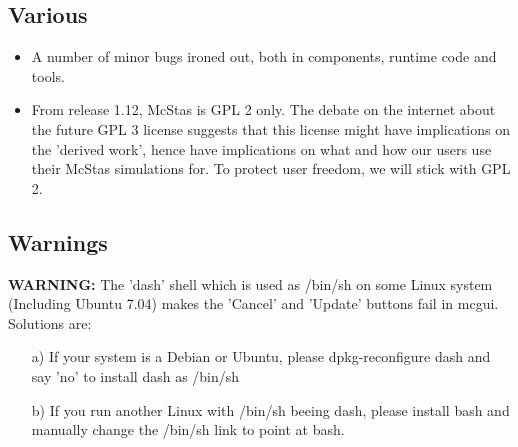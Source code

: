 \subsection{Various}
\begin{itemize}
\item  A number of minor bugs ironed out, both in components, runtime code and tools.
\item From release 1.12, McStas is GPL 2 only. The debate on the internet about the future GPL 3 license suggests that this license 
     might have implications on the 'derived work', hence have implications on what and how our users use their McStas simulations
     for. To protect user freedom, we will stick with GPL 2.     
\end{itemize}

\subsection{Warnings}
{\bf WARNING:} The 'dash' shell which is used as /bin/sh on some Linux system (Including Ubuntu 7.04) makes the 'Cancel' and 'Update' 
buttons fail in mcgui. Solutions are:
\begin{itemize}
\item[a)] If your system is a Debian or Ubuntu, please dpkg-reconfigure dash and say 'no' to install dash as /bin/sh
\item[b)] If you run another Linux with /bin/sh beeing dash, please install bash and manually change the /bin/sh link to point at bash.
\end{itemize}

